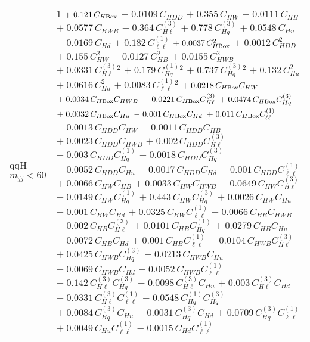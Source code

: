 \begin{tabular}{l|p{}}
    qqH $m_{jj} < 60$ & 1 $+\;0.121\,C_{H\rm{Box}}$ $-\;0.0109\,C_{HDD}$ $+\;0.355\,C_{HW}$ $+\;0.0111\,C_{HB}$ $+\;0.0577\,C_{HWB}$ $-\;0.364\,C^{(3)}_{H\ell}$ $+\;0.778\,C^{(3)}_{Hq}$ $+\;0.0548\,C_{Hu}$ $-\;0.0169\,C_{Hd}$ $+\;0.182\,C^{(1)}_{\ell\ell}$ $+\;0.0037\,C_{H\rm{Box}}^{2}$ $+\;0.0012\,C_{HDD}^{2}$ $+\;0.155\,C_{HW}^{2}$ $+\;0.0127\,C_{HB}^{2}$ $+\;0.0155\,C_{HWB}^{2}$ $+\;0.0331\,C^{(3)}_{H\ell}^{2}$ $+\;0.179\,C^{(1)}_{Hq}^{2}$ $+\;0.737\,C^{(3)}_{Hq}^{2}$ $+\;0.132\,C_{Hu}^{2}$ $+\;0.0616\,C_{Hd}^{2}$ $+\;0.0083\,C^{(1)}_{\ell\ell}^{2}$ $+\;0.0218\,C_{H\rm{Box}}C_{HW}$ $+\;0.0034\,C_{H\rm{Box}}C_{HWB}$ $-\;0.0221\,C_{H\rm{Box}}C^{(3)}_{H\ell}$ $+\;0.0474\,C_{H\rm{Box}}C^{(3)}_{Hq}$ $+\;0.0032\,C_{H\rm{Box}}C_{Hu}$ $-\;0.001\,C_{H\rm{Box}}C_{Hd}$ $+\;0.011\,C_{H\rm{Box}}C^{(1)}_{\ell\ell}$ $-\;0.0013\,C_{HDD}C_{HW}$ $-\;0.0011\,C_{HDD}C_{HB}$ $+\;0.0023\,C_{HDD}C_{HWB}$ $+\;0.002\,C_{HDD}C^{(3)}_{H\ell}$ $-\;0.003\,C_{HDD}C^{(1)}_{Hq}$ $-\;0.0018\,C_{HDD}C^{(3)}_{Hq}$ $-\;0.0052\,C_{HDD}C_{Hu}$ $+\;0.0017\,C_{HDD}C_{Hd}$ $-\;0.001\,C_{HDD}C^{(1)}_{\ell\ell}$ $+\;0.0066\,C_{HW}C_{HB}$ $+\;0.0033\,C_{HW}C_{HWB}$ $-\;0.0649\,C_{HW}C^{(3)}_{H\ell}$ $-\;0.0149\,C_{HW}C^{(1)}_{Hq}$ $+\;0.443\,C_{HW}C^{(3)}_{Hq}$ $+\;0.0026\,C_{HW}C_{Hu}$ $-\;0.001\,C_{HW}C_{Hd}$ $+\;0.0325\,C_{HW}C^{(1)}_{\ell\ell}$ $-\;0.0066\,C_{HB}C_{HWB}$ $-\;0.002\,C_{HB}C^{(3)}_{H\ell}$ $+\;0.0101\,C_{HB}C^{(1)}_{Hq}$ $+\;0.0279\,C_{HB}C_{Hu}$ $-\;0.0072\,C_{HB}C_{Hd}$ $+\;0.001\,C_{HB}C^{(1)}_{\ell\ell}$ $-\;0.0104\,C_{HWB}C^{(3)}_{H\ell}$ $+\;0.0425\,C_{HWB}C^{(3)}_{Hq}$ $+\;0.0213\,C_{HWB}C_{Hu}$ $-\;0.0069\,C_{HWB}C_{Hd}$ $+\;0.0052\,C_{HWB}C^{(1)}_{\ell\ell}$ $-\;0.142\,C^{(3)}_{H\ell}C^{(3)}_{Hq}$ $-\;0.0098\,C^{(3)}_{H\ell}C_{Hu}$ $+\;0.003\,C^{(3)}_{H\ell}C_{Hd}$ $-\;0.0331\,C^{(3)}_{H\ell}C^{(1)}_{\ell\ell}$ $-\;0.0548\,C^{(1)}_{Hq}C^{(3)}_{Hq}$ $+\;0.0084\,C^{(3)}_{Hq}C_{Hu}$ $-\;0.0031\,C^{(3)}_{Hq}C_{Hd}$ $+\;0.0709\,C^{(3)}_{Hq}C^{(1)}_{\ell\ell}$ $+\;0.0049\,C_{Hu}C^{(1)}_{\ell\ell}$ $-\;0.0015\,C_{Hd}C^{(1)}_{\ell\ell}$ \\

\end{tabular}
